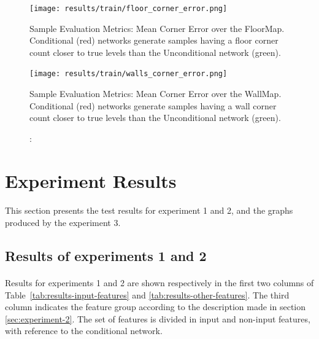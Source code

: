 \begin{figure}[!htb] 
	\begin{minipage}[b]{\linewidth}
		\centering
		\texttt{[image: results/train/floor\_corner\_error.png]} 
		\caption[Sample Evaluation Metrics: Mean Corner Error (FloorMap)]: {Sample Evaluation Metrics: Mean Corner Error over the FloorMap. Conditional (red) networks generate samples having a floor corner count closer to true levels than the Unconditional network (green).}
		\label{fig:floor_corner_error}
	\end{minipage}

	\begin{minipage}[b]{\linewidth}
		\centering
		\texttt{[image: results/train/walls\_corner\_error.png]} 
		\caption[Sample Evaluation Metrics: Mean Corner Error (WallMap)]: {Sample Evaluation Metrics: Mean Corner Error over the WallMap. Conditional (red) networks generate samples having a wall corner count closer to true levels than the Unconditional network (green).}
		\label{fig:wall_corner_error}
	\end{minipage}
\end{figure}


\FloatBarrier
\section{Experiment Results}
\label{sec:results-experiments}
\paragraph{} This section presents the test results for experiment 1 and 2, and the graphs produced by the experiment 3.
\subsection{Results of experiments 1 and 2}
\paragraph{} Results for experiments 1 and 2 are shown respectively in the first two columns of Table~\ref{tab:results-input-features} and \ref{tab:results-other-features}. The third column indicates the feature group according to the description made in section \ref{sec:experiment-2}. The set of features is divided in input and non-input features, with reference to the conditional network.
	
